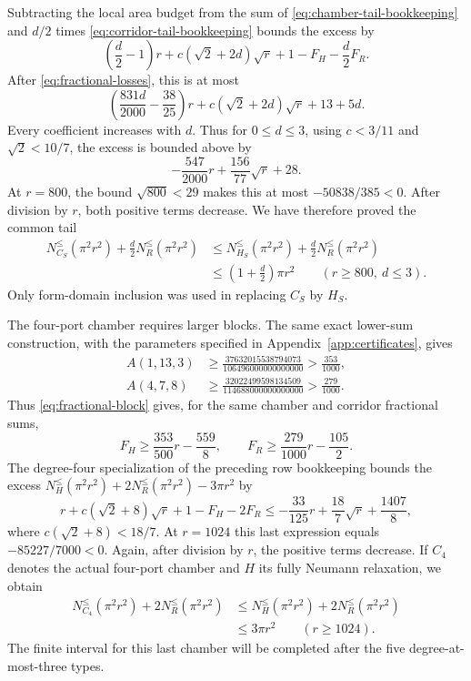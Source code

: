 \documentclass[11pt,reqno]{amsart}
\numberwithin{equation}{section}
\begin{document}
Subtracting the local area budget from the sum of
\eqref{eq:chamber-tail-bookkeeping} and $d/2$ times
\eqref{eq:corridor-tail-bookkeeping} bounds the excess by
\[
 \left(\frac d2-1\right)r+
 c(\sqrt2+2d)\sqrt r+1-F_H-\frac d2F_R.
\]
After \eqref{eq:fractional-losses}, this is at most
\[
 \left(\frac{831d}{2000}-\frac{38}{25}\right)r+
 c(\sqrt2+2d)\sqrt r+13+5d.
\]
Every coefficient increases with $d$. Thus for $0\le d\le3$, using
$c<3/11$ and $\sqrt2<10/7$, the excess is bounded above by
\[
 -\frac{547}{2000}r+\frac{156}{77}\sqrt r+28.
\]
At $r=800$, the bound $\sqrt{800}<29$ makes this at most
$-50838/385<0$. After division by $r$, both positive terms decrease.
We have therefore proved the common tail
\begin{equation}
 \begin{aligned}
  N_{C_S}^{\le}(\pi^2r^2)+\frac d2N_R^{\le}(\pi^2r^2)
  &\le N_{H_S}^{\le}(\pi^2r^2)+\frac d2N_R^{\le}(\pi^2r^2)\\
  &\le\left(1+\frac d2\right)\pi r^2
       \qquad(r\ge800,\ d\le3).
 \end{aligned}
 \label{eq:compact-tail}
\end{equation}
Only form-domain inclusion was used in replacing $C_S$ by $H_S$.

The four-port chamber requires larger blocks. The same exact lower-sum
construction, with the parameters specified in
Appendix~\ref{app:certificates}, gives
\begin{align}
 A(1,13,3)&\ge\frac{37632015538794073}{106496000000000000}
                >\frac{353}{1000},\nonumber\\
 A(4,7,8)&\ge\frac{32022499598134509}{114688000000000000}
                >\frac{279}{1000}.
 \label{eq:degree-four-integrals}
\end{align}
Thus \eqref{eq:fractional-block} gives, for the same chamber and
corridor fractional sums,
\[
 F_H\ge\frac{353}{500}r-\frac{559}{8},\qquad
 F_R\ge\frac{279}{1000}r-\frac{105}{2}.
\]
The degree-four specialization of the preceding row bookkeeping bounds
the excess $N_H^{\le}(\pi^2r^2)+2N_R^{\le}(\pi^2r^2)-3\pi r^2$
by
\[
 r+c(\sqrt2+8)\sqrt r+1-F_H-2F_R
 \le-\frac{33}{125}r+\frac{18}{7}\sqrt r+\frac{1407}{8},
\]
where $c(\sqrt2+8)<18/7$. At $r=1024$ this last expression equals
$-85227/7000<0$. Again, after division by $r$, the positive terms
decrease. If $C_4$ denotes the actual four-port chamber and $H$ its fully
Neumann relaxation, we obtain
\begin{equation}
 \begin{aligned}
 N_{C_4}^{\le}(\pi^2r^2)+2N_R^{\le}(\pi^2r^2)
 &\le N_H^{\le}(\pi^2r^2)+2N_R^{\le}(\pi^2r^2)\\
 &\le3\pi r^2\qquad(r\ge1024).
 \end{aligned}
 \label{eq:degree-four-tail}
\end{equation}
The finite interval for this last chamber will be completed after the
five degree-at-most-three types.
\end{document}
